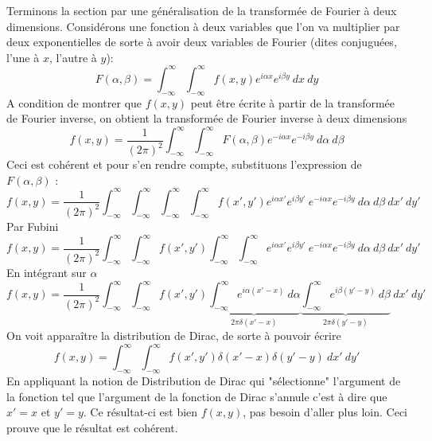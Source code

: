 Terminons la section par une généralisation de la transformée de Fourier à deux dimensions. 
Considérons une fonction à deux variables que l'on va multiplier par deux exponentielles de 
sorte à avoir deux variables de Fourier (dites conjuguées, l'une à $x$, l'autre à $y$):
\begin{equation}
F(\alpha,\beta) = \int_{-\infty}^\infty\int_{-\infty}^\infty f(x,y)e^{i\alpha x}e^{i\beta y}\ 
dx\ dy
\end{equation}
A condition de montrer que $f(x,y)$ peut être écrite à partir de la transformée de Fourier 
inverse, on obtient la transformée de Fourier inverse à deux dimensions
\begin{equation}
f(x,y) = \frac{1}{(2\pi)^2} \int_{-\infty}^\infty\int_{-\infty}^\infty F(\alpha,\beta)
e^{-i\alpha x}e^{-i\beta y}\ d\alpha\ d\beta
\end{equation}
Ceci est cohérent et pour s'en rendre compte, substituons l'expression de $F(\alpha,\beta)$ :
\begin{equation}
f(x,y) = \frac{1}{(2\pi)^2} \int_{-\infty}^\infty\int_{-\infty}^\infty \int_{-\infty}^\infty
\int_{-\infty}^\infty f(x',y')e^{i\alpha x'}e^{i\beta y'}\ e^{-i\alpha x}e^{-i\beta y}\
 d\alpha\ d\beta\ dx'\ dy' 
\end{equation}
Par Fubini
\begin{equation}
f(x,y) = \frac{1}{(2\pi)^2} \int_{-\infty}^\infty\int_{-\infty}^\infty f(x',y') \int_{-\infty}^\infty
\int_{-\infty}^\infty e^{i\alpha x'}e^{i\beta y'}\ e^{-i\alpha x}e^{-i\beta y}\
 d\alpha\ d\beta\ dx'\ dy' 
\end{equation}
En intégrant sur $\alpha$
\begin{equation}
f(x,y) = \frac{1}{(2\pi)^2} \int_{-\infty}^\infty\int_{-\infty}^\infty f(x',y') \underbrace{
\int_{-\infty}^\infty e^{i\alpha(x'-x)}\ d\alpha}_{2\pi\delta(x'-x)} \underbrace{\int_{-\infty}^\infty 
e^{i\beta(y'-y)}\ d\beta}_{2\pi\delta(y'-y)}\ dx'\ dy'
\end{equation}
On voit apparaître la distribution de Dirac, de sorte à pouvoir écrire
\begin{equation}
f(x,y) = \int_{-\infty}^\infty\int_{-\infty}^\infty f(x',y')\delta(x'-x)\delta(y'-y)\ dx'\ dy'
\end{equation}
En appliquant la notion de Distribution de Dirac qui "sélectionne" l'argument de la fonction tel 
que l'argument de la fonction de Dirac s'annule c'est à dire que $x'=x$ et $y'=y$. Ce résultat-ci 
est bien $f(x,y)$, pas besoin d'aller plus loin. Ceci prouve que le résultat est cohérent.





